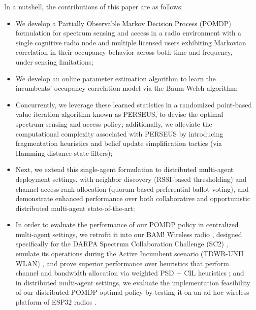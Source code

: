 \documentclass[12pt, draftcls, onecolumn]{IEEEtran}
\begin{document}
 In a nutshell, the contributions of this paper are as follows:
\begin{itemize}
    \item We develop a 
     Partially Observable Markov Decision Process (POMDP) formulation for spectrum sensing and access in a radio environment with a single cognitive radio node and multiple licensed users exhibiting Markovian correlation in their occupancy behavior across both time and frequency, under sensing limitations;
    \item We develop an online parameter estimation algorithm to learn the incumbents' occupancy correlation model via  the Baum-Welch algorithm;
    \item Concurrently, we leverage these learned statistics in a randomized point-based value iteration algorithm known as PERSEUS, to devise the optimal spectrum sensing and access policy; additionally, we alleviate the computational complexity associated with PERSEUS by introducing fragmentation heuristics and belief update simplification tactics (via Hamming distance state filters);
    \item Next, we extend this single-agent formulation to distributed multi-agent deployment settings, with neighbor discovery (RSSI-based thresholding) and channel access rank allocation (quorum-based preferential ballot voting), and demonstrate enhanced performance over both collaborative and opportunistic distributed multi-agent state-of-the-art;
    \item In order to evaluate the performance of our POMDP policy in centralized multi-agent settings, we retrofit it into our BAM! Wireless radio \cite{BAM}, designed specifically for the DARPA Spectrum Collaboration Challenge (SC2) \cite{DARPA:SC2, DARPA:SC2scenarios}, emulate its operations during the Active Incumbent scenario (TDWR-UNII WLAN) \cite{DARPA:ActiveIncumbent}, and prove superior performance over heuristics that perform channel and bandwidth allocation via weighted PSD + CIL heuristics \cite{DARPA:CIL, DARPASC2:end1, 8935729, DARPASC2:end3, DARPASC2:end4}; and in distributed multi-agent settings, we evaluate the implementation feasibility of our distributed POMDP optimal policy by testing it on an ad-hoc wireless platform of ESP32 radios \cite{GCTronic:epuck2, Espressif:ESP32}.
\end{itemize}
\end{document}
